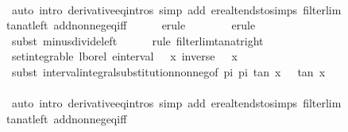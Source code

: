 \documentclass{article}
\theoremstyle{definition}
\begin{document}
\begin{figure}
\begin{isabellebody}
\ \ \ \ \isamarkupfalse%
\ {\isacharparenleft}auto\ intro{\isacharcolon}\ derivative{\isacharunderscore}eq{\isacharunderscore}intros\ simp\ add{\isacharcolon}\ ereal{\isacharunderscore}tendsto{\isacharunderscore}simps\ filterlim{\isacharunderscore}tan{\isacharunderscore}at{\isacharunderscore}left\ add{\isacharunderscore}nonneg{\isacharunderscore}eq{\isacharunderscore}{}{\isacharunderscore}iff{\isacharparenright}\isanewline
\ \ \ \ \isamarkupfalse%
\ {\isacharparenleft}erule\ {\isacharparenleft}{}{\isacharparenright}\ {}{\isacharparenright}\isanewline
\ \ \ \ \isamarkupfalse%
\ {\isacharparenleft}erule\ {\isacharparenleft}{}{\isacharparenright}\ {}{\isacharparenright}\isanewline
\ \ \ \ \isamarkupfalse%
\ {\isacharparenleft}subst\ minus{\isacharunderscore}divide{\isacharunderscore}left{\isacharparenright}{\isacharplus}\isanewline
\ \ \ \ \isamarkupfalse%
\ {\isacharparenleft}rule\ filterlim{\isacharunderscore}tan{\isacharunderscore}at{\isacharunderscore}right{\isacharparenright}\isanewline
\ \ \isamarkupfalse%
\ {\isachardoublequoteopen}set{\isacharunderscore}integrable\ lborel\ {\isacharparenleft}einterval\ {\isacharparenleft}{\isacharminus}{\isasyminfinity}{\isacharparenright}\ {\isasyminfinity}{\isacharparenright}\ {\isacharparenleft}{\isasymlambda}x{\isachardot}\ inverse\ {\isacharparenleft}{}\ {\isacharplus}\ x{\isacharcircum}{}{\isacharparenright}{\isacharparenright}{\isachardoublequoteclose}\isanewline
\ \ \ \ \isamarkupfalse%
\ {\isacharparenleft}subst\ interval{\isacharunderscore}integral{\isacharunderscore}substitution{\isacharunderscore}nonneg{\isacharbrackleft}of\ {\isachardoublequoteopen}{\isacharminus}pi{\isacharslash}{}{\isachardoublequoteclose}\ {\isachardoublequoteopen}pi{\isacharslash}{}{\isachardoublequoteclose}\ tan\ {\isachardoublequoteopen}{\isasymlambda}x{\isachardot}\ {}\ {\isacharplus}\ {\isacharparenleft}tan\ x{\isacharparenright}{\isacharcircum}{}{\isachardoublequoteclose}{\isacharbrackright}{\isacharparenright}\isanewline
\ \ \ \ \isamarkupfalse%
\ {\isacharparenleft}auto\ intro{\isacharcolon}\ derivative{\isacharunderscore}eq{\isacharunderscore}intros\ simp\ add{\isacharcolon}\ ereal{\isacharunderscore}tendsto{\isacharunderscore}simps\ filterlim{\isacharunderscore}tan{\isacharunderscore}at{\isacharunderscore}left\ add{\isacharunderscore}nonneg{\isacharunderscore}eq{\isacharunderscore}{}{\isacharunderscore}iff{\isacharparenright}\isanewline

\end{isabellebody}
\end{figure}
\end{document}
